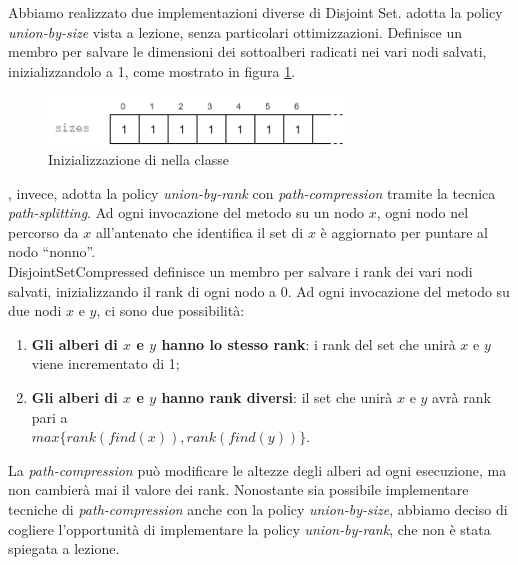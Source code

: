 \noindent Abbiamo realizzato due implementazioni diverse di Disjoint Set.
 adotta la policy \textit{union-by-size} vista a lezione, senza particolari ottimizzazioni. Definisce un membro  per salvare le dimensioni dei sottoalberi radicati nei vari nodi salvati, inizializzandolo a 1, come mostrato in figura \ref{fig:disjoint-set-sizes}.

\begin{figure}[htbp]
	\centering
    \includegraphics[width=0.7\textwidth]{./images/DisjointSetSizesVector.png}
	\caption{Inizializzazione di  nella classe }
	\label{fig:disjoint-set-sizes}
\end{figure}

\noindent {}, invece, adotta la policy \textit{union-by-rank} con \textit{path-compression} tramite la tecnica \textit{path-splitting}.
Ad ogni invocazione del metodo  su un nodo $x$, ogni nodo nel percorso da $x$ all'antenato che identifica il set di $x$ è aggiornato per puntare al nodo ``nonno''. \\
\noindent DisjointSetCompressed definisce un membro  per salvare i rank dei vari nodi salvati, inizializzando il rank di ogni nodo a 0. Ad ogni invocazione del metodo  su due nodi $x$ e $y$, ci sono due possibilità:

\begin{enumerate}
    \item \textbf{Gli alberi di $x$ e $y$ hanno lo stesso rank}: i rank del set che unirà $x$ e $y$ viene incrementato di 1;
    \item \textbf{Gli alberi di $x$ e $y$ hanno rank diversi}: il set che unirà $x$ e $y$ avrà rank pari a \\ $max\{ rank(find(x)), rank(find(y)) \}$.
\end{enumerate}

\noindent La \textit{path-compression} può modificare le altezze degli alberi ad ogni esecuzione, ma non cambierà mai il valore dei rank.
Nonostante sia possibile implementare tecniche di \textit{path-compression} anche con la policy \textit{union-by-size}, abbiamo deciso di cogliere l'opportunità di implementare la policy \textit{union-by-rank}, che non è stata spiegata a lezione. \\

